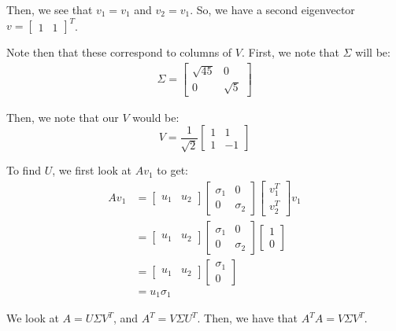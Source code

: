 \documentclass[openany]{book}
\begin{document}
\begin{solution}
	Then, we see that $v_1 = v_1$ and $v_2 = v_1$. So, we have a second eigenvector $v = \begin{bmatrix}
		1 & 1
	\end{bmatrix}^{T}$.

	Note then that these correspond to columns of $V$. First, we note that $\Sigma$ will be:
	\begin{align*}\Sigma = 
		\begin{bmatrix}
			\sqrt{45} & 0 \\ 0 & \sqrt 5
		\end{bmatrix}
	\end{align*}

	Then, we note that our $V$ would be:
	\begin{equation*}
		V = \frac 1 {\sqrt{2}} \begin{bmatrix}
			 1 & 1 \\ 1 & -1
		\end{bmatrix}
	\end{equation*}

	To find $U$, we first look at $Av_1$ to get:
	\begin{align*}
		Av_1 &= \begin{bmatrix}
			u_1 & u_2
		\end{bmatrix}\begin{bmatrix}
		\sigma_1 & 0 \\ 0 & \sigma_2
	\end{bmatrix}\begin{bmatrix}
	v_1^{T} \\ v_2^{T}
\end{bmatrix}v_1 \\
	&= \begin{bmatrix}
		u_1 & u_2
	\end{bmatrix}\begin{bmatrix}
		\sigma_1 & 0 \\ 0 & \sigma_2
	\end{bmatrix}\begin{bmatrix}
	1 \\ 0
\end{bmatrix} \\
&= \begin{bmatrix}
	u_1 & u_2 
\end{bmatrix}\begin{bmatrix}
\sigma_1 \\ 0
\end{bmatrix} \\
&= u_1\sigma_1
\end{align*}
\end{solution}

\begin{solution}
	We look at $A = U\Sigma V^{T}$, and $A^{T} = V \Sigma U^{T}$. Then, we have that $A^{T}A = V \Sigma V^{T}$.
\end{solution}
\end{document}
